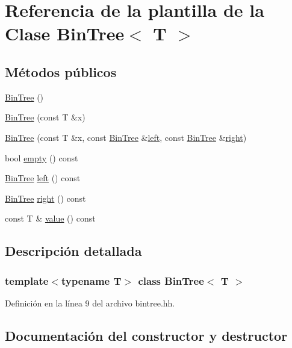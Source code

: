 \hypertarget{class_bin_tree}{}\section{Referencia de la plantilla de la Clase Bin\+Tree$<$ T $>$}
\label{class_bin_tree}
\subsection*{Métodos públicos}
\begin{DoxyCompactItemize}
\item 
\hyperlink{class_bin_tree_a47eef22d29cd023449d97c073c08e5b6}{Bin\+Tree} ()
\item 
\hyperlink{class_bin_tree_a1ab686e0bcf990093ff91fe71744c1a4}{Bin\+Tree} (const T \&x)
\item 
\hyperlink{class_bin_tree_adb7eeff76d08130c943b36af215eb521}{Bin\+Tree} (const T \&x, const \hyperlink{class_bin_tree}{Bin\+Tree} \&\hyperlink{class_bin_tree_a82108db4c1b08d1f111027788c196d4e}{left}, const \hyperlink{class_bin_tree}{Bin\+Tree} \&\hyperlink{class_bin_tree_aff8e96651b27284c329667b5ad3e4d0b}{right})
\item 
bool \hyperlink{class_bin_tree_a74cda259ba5c25b8ee38ed4dc33e4fad}{empty} () const
\item 
\hyperlink{class_bin_tree}{Bin\+Tree} \hyperlink{class_bin_tree_a82108db4c1b08d1f111027788c196d4e}{left} () const
\item 
\hyperlink{class_bin_tree}{Bin\+Tree} \hyperlink{class_bin_tree_aff8e96651b27284c329667b5ad3e4d0b}{right} () const
\item 
const T \& \hyperlink{class_bin_tree_a734e785b089c87b49187ee7c58edf5f3}{value} () const
\end{DoxyCompactItemize}


\subsection{Descripción detallada}
\subsubsection*{template$<$typename T$>$\newline
class Bin\+Tree$<$ T $>$}



Definición en la línea 9 del archivo bintree.\+hh.



\subsection{Documentación del constructor y destructor}
\mbox{\label{class_bin_tree_a47eef22d29cd023449d97c073c08e5b6}} 
